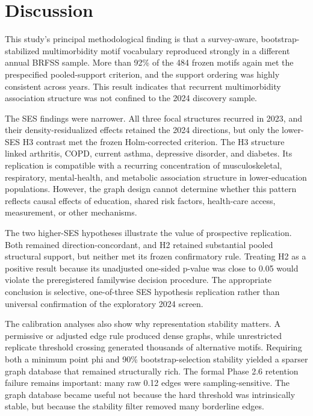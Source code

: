 \documentclass[11pt]{article}
\newcommand{\brfss}{\textsc{BRFSS}}
\begin{document}
\section{Discussion}

This study's principal methodological finding is that a survey-aware,
bootstrap-stabilized multimorbidity motif vocabulary reproduced strongly in a
different annual \brfss{} sample. More than 92\% of the 484 frozen motifs
again met the prespecified pooled-support criterion, and the support ordering
was highly consistent across years. This result indicates that recurrent
multimorbidity association structure was not confined to the 2024 discovery
sample.

The SES findings were narrower. All three focal structures recurred in 2023,
and their density-residualized effects retained the 2024 directions, but only
the lower-SES H3 contrast met the frozen Holm-corrected criterion. The H3
structure linked arthritis, COPD, current asthma, depressive disorder, and
diabetes. Its replication is compatible with a recurring concentration of
musculoskeletal, respiratory, mental-health, and metabolic association
structure in lower-education populations. However, the graph design cannot
determine whether this pattern reflects causal effects of education, shared
risk factors, health-care access, measurement, or other mechanisms.

The two higher-SES hypotheses illustrate the value of prospective
replication. Both remained direction-concordant, and H2 retained substantial
pooled structural support, but neither met its frozen confirmatory rule.
Treating H2 as a positive result because its unadjusted one-sided p-value was
close to 0.05 would violate the preregistered familywise decision procedure.
The appropriate conclusion is selective, one-of-three SES hypothesis
replication rather than universal confirmation of the exploratory 2024
screen.

The calibration analyses also show why representation stability matters.
A permissive or adjusted edge rule produced dense graphs, while unrestricted
replicate threshold crossing generated thousands of alternative motifs.
Requiring both a minimum point phi and 90\% bootstrap-selection stability
yielded a sparser graph database that remained structurally rich. The formal
Phase 2.6 retention failure remains important: many raw 0.12 edges were
sampling-sensitive. The graph database became useful not because the hard
threshold was intrinsically stable, but because the stability filter removed
many borderline edges.
\end{document}

